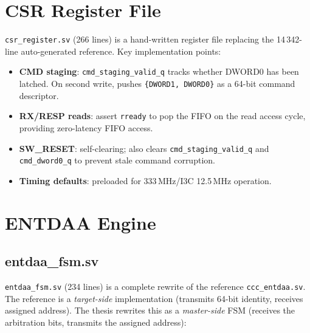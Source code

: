 \documentclass[12pt, a4paper, oneside]{report}
\newcommand{\signal}[1]{\texttt{#1}}
\newcommand{\file}[1]{\texttt{#1}}
\begin{document}
\section{CSR Register File}

\file{csr\_register.sv} (266 lines) is a hand-written register file replacing the
14\,342-line auto-generated reference. Key implementation points:

\begin{itemize}
  \item \textbf{CMD staging}: \signal{cmd\_staging\_valid\_q} tracks whether DWORD0
        has been latched. On second write, pushes \lstinline|{DWORD1, DWORD0}| as a
        64-bit command descriptor.
  \item \textbf{RX/RESP reads}: assert \signal{rready} to pop the FIFO on the read
        access cycle, providing zero-latency FIFO access.
  \item \textbf{SW\_RESET}: self-clearing; also clears \signal{cmd\_staging\_valid\_q}
        and \signal{cmd\_dword0\_q} to prevent stale command corruption.
  \item \textbf{Timing defaults}: preloaded for 333\,MHz/I3C 12.5\,MHz operation.
\end{itemize}

\section{ENTDAA Engine}

\subsection{entdaa\_fsm.sv}

\file{entdaa\_fsm.sv} (234 lines) is a complete rewrite of the reference
\file{ccc\_entdaa.sv}. The reference is a \emph{target-side} implementation (transmits
64-bit identity, receives assigned address). The thesis rewrites this as a
\emph{master-side} FSM (receives the arbitration bits, transmits the assigned address):
\end{document}
